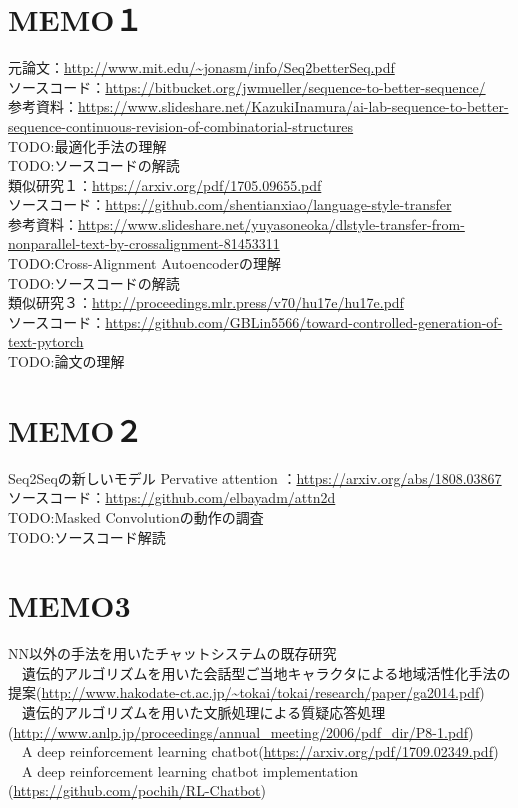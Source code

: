 \documentclass{scrartcl}
\begin{document}
\section{MEMO１}
\label{sec:orga61dcf5}
元論文：\url{http://www.mit.edu/\~jonasm/info/Seq2betterSeq.pdf}\\
ソースコード：\url{https://bitbucket.org/jwmueller/sequence-to-better-sequence/}\\
参考資料：\url{https://www.slideshare.net/KazukiInamura/ai-lab-sequence-to-better-sequence-continuous-revision-of-combinatorial-structures}\\
TODO:最適化手法の理解\\
TODO:ソースコードの解読\\

類似研究１：\url{https://arxiv.org/pdf/1705.09655.pdf}\\
ソースコード：\url{https://github.com/shentianxiao/language-style-transfer}\\
参考資料：\url{https://www.slideshare.net/yuyasoneoka/dlstyle-transfer-from-nonparallel-text-by-crossalignment-81453311}\\
TODO:Cross-Alignment Autoencoderの理解\\
TODO:ソースコードの解読\\

類似研究３：\url{http://proceedings.mlr.press/v70/hu17e/hu17e.pdf}\\
ソースコード：\url{https://github.com/GBLin5566/toward-controlled-generation-of-text-pytorch}\\
TODO:論文の理解\\
\section{MEMO２}
\label{sec:org4d28197}
Seq2Seqの新しいモデル Pervative attention ：\url{https://arxiv.org/abs/1808.03867}\\
ソースコード：\url{https://github.com/elbayadm/attn2d}\\
TODO:Masked Convolutionの動作の調査\\
TODO:ソースコード解読\\
\section{MEMO3}
\label{sec:orgc07f94a}
  NN以外の手法を用いたチャットシステムの既存研究\\
　遺伝的アルゴリズムを用いた会話型ご当地キャラクタによる地域活性化手法の提案(\url{http://www.hakodate-ct.ac.jp/\~tokai/tokai/research/paper/ga2014.pdf})\\
　遺伝的アルゴリズムを用いた文脈処理による質疑応答処理(\url{http://www.anlp.jp/proceedings/annual\_meeting/2006/pdf\_dir/P8-1.pdf})\\
　A deep reinforcement learning chatbot(\url{https://arxiv.org/pdf/1709.02349.pdf})\\
　A deep reinforcement learning chatbot implementation (\url{https://github.com/pochih/RL-Chatbot})\\
\end{document}
